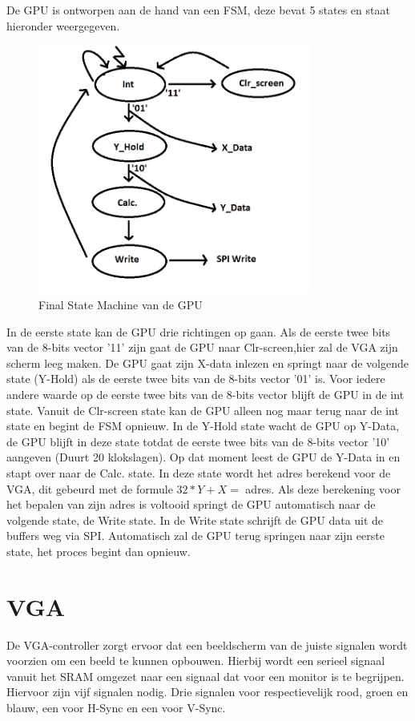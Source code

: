 \documentclass[oneside,dutch]{tudelft-report}
\begin{document}
De GPU is ontworpen aan de hand van een FSM, deze bevat 5 states en staat hieronder weergegeven.

\begin{figure}[H]
\center
\includegraphics[width=9cm]{FSM_GPU}
\caption{Final State Machine van de GPU}
\label{sub-GPU}
\end{figure}

In de eerste state kan de GPU drie richtingen op gaan. Als de eerste twee bits van de 8-bits vector '11' zijn gaat de GPU naar Clr-screen,hier zal de VGA zijn scherm leeg maken. De GPU gaat zijn X-data inlezen en springt naar de volgende state (Y-Hold) als de eerste twee bits van de 8-bits vector '01' is. Voor iedere andere waarde op de eerste twee bits van de 8-bits vector blijft de GPU in de int state. Vanuit de Clr-screen state kan de GPU alleen nog maar terug naar de int state en begint de FSM opnieuw. In de Y-Hold state wacht de GPU op Y-Data, de GPU blijft in deze state totdat de eerste twee bits van de 8-bits vector '10' aangeven (Duurt 20 klokslagen). Op dat moment leest de GPU de Y-Data in en stapt over naar de Calc. state. In deze state wordt het adres berekend voor de VGA, dit gebeurd met de formule $32*Y+X =$ adres. Als deze berekening voor het bepalen van zijn adres is voltooid springt de GPU automatisch naar de volgende state, de Write state. In de Write state schrijft de GPU data uit de buffers weg via SPI. Automatisch zal de GPU terug springen naar zijn eerste state, het proces begint dan opnieuw. 

\chapter{VGA}
De VGA-controller zorgt ervoor dat een beeldscherm van de juiste signalen wordt voorzien om een beeld te kunnen opbouwen. Hierbij wordt een serieel signaal vanuit het SRAM omgezet naar een signaal dat voor een monitor is te begrijpen. Hiervoor zijn vijf signalen nodig. Drie signalen voor respectievelijk rood, groen en blauw, een voor H-Sync en een voor V-Sync. 
\end{document}

